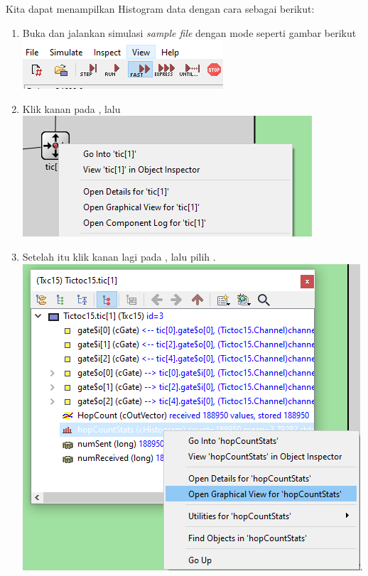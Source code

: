 \documentclass[conference]{IEEEtran}
\begin{document}
Kita dapat menampilkan Histogram data dengan cara sebagai berikut:
\begin{enumerate}
	\item Buka dan jalankan simulasi \textit{sample file}  dengan mode  seperti gambar berikut\break
	      \includegraphics[scale=0.8]{images/fast-mode-button.png}

	\item Klik kanan pada , lalu \break
	      \includegraphics[scale=0.53]{images/tic[1].png}

	\item Setelah itu klik kanan lagi pada , lalu pilih .\break
	      \includegraphics[scale=0.5]{images/tic[1]-histogram.png}. \break


\end{enumerate}
\end{document}
